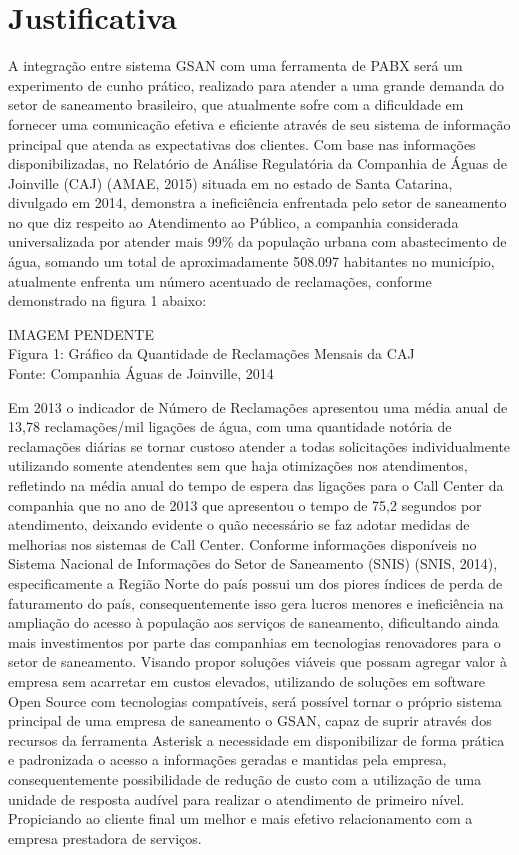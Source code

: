 \section{Justificativa}
A integração entre sistema GSAN com uma ferramenta de PABX será um experimento de cunho prático, realizado para atender a uma grande demanda do setor de saneamento brasileiro, que atualmente sofre com a dificuldade em fornecer uma comunicação efetiva e eficiente através de seu sistema de informação principal que atenda as expectativas dos clientes.
Com base nas informações disponibilizadas, no Relatório de Análise Regulatória da Companhia de Águas de Joinville (CAJ) (AMAE, 2015) situada em no estado de Santa Catarina, divulgado em 2014, demonstra a ineficiência enfrentada pelo setor de saneamento no que diz respeito ao Atendimento ao Público, a companhia considerada universalizada por atender mais 99\% da população urbana com abastecimento de água, somando um total de aproximadamente 508.097 habitantes no município, atualmente enfrenta um número acentuado de reclamações, conforme demonstrado na figura 1 abaixo:
 
\begin{center}
	IMAGEM PENDENTE \\
	Figura 1: Gráfico da Quantidade de Reclamações Mensais da CAJ \\
	Fonte: Companhia Águas de Joinville, 2014 \\
\end{center}

 Em 2013 o indicador de Número de Reclamações apresentou uma média anual de 13,78 reclamações/mil ligações de água, com uma quantidade notória de reclamações diárias se tornar custoso atender a todas solicitações individualmente utilizando somente atendentes sem que haja otimizações nos atendimentos, refletindo na média anual do tempo de espera das ligações para o Call Center da companhia que no ano de 2013 que apresentou o tempo de 75,2 segundos por atendimento, deixando evidente o quão necessário se faz adotar medidas de melhorias nos sistemas de Call Center. Conforme informações disponíveis no Sistema Nacional de Informações do Setor de Saneamento (SNIS) (SNIS, 2014), especificamente a Região Norte do país possui um dos piores índices de perda de faturamento do país, consequentemente isso gera lucros menores e ineficiência na ampliação do acesso à população aos serviços de saneamento, dificultando ainda mais investimentos por parte das companhias em tecnologias renovadores para o setor de saneamento. Visando propor soluções viáveis que possam agregar valor à empresa sem acarretar em custos elevados, utilizando de soluções em software Open Source com tecnologias compatíveis, será possível tornar o próprio sistema principal de uma empresa de saneamento o GSAN, capaz de suprir através dos recursos da ferramenta Asterisk a necessidade em disponibilizar de forma prática e padronizada o acesso a informações geradas e mantidas pela empresa, consequentemente possibilidade de redução de custo com a utilização de uma unidade de resposta audível para realizar o atendimento de primeiro nível. Propiciando ao cliente final um melhor e mais efetivo relacionamento com a empresa prestadora de serviços.

